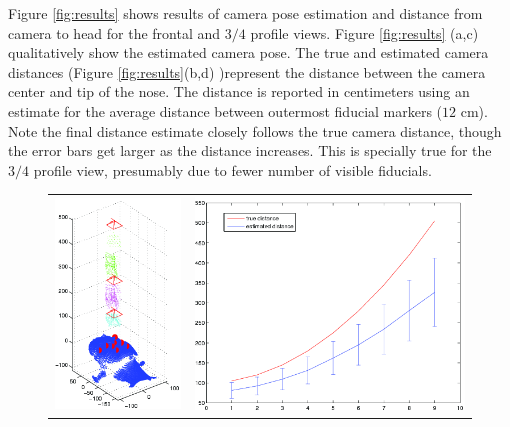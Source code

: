 \documentclass[runningheads]{llncs}
\begin{document}
Figure \ref{fig:results} shows results of camera pose estimation and distance from camera to head for the frontal and $3/4$ profile views.  Figure \ref{fig:results} (a,c) qualitatively show the estimated camera pose.  The true and estimated camera distances (Figure \ref{fig:results}(b,d) )represent the distance between the camera center and tip of the nose.  The distance is reported in centimeters using an estimate for the average distance between outermost fiducial markers ($12$ cm). Note the final distance estimate closely follows the true camera distance, though the error bars get larger as the distance increases.  This is specially true for the $3/4$ profile view, presumably due to fewer number of visible fiducials.   
\begin{figure}[ht]
\begin{tabular}{cc}
\includegraphics[width=.5\linewidth]{resources/figures/cameraloc_frontal.png} &
\includegraphics[width=.5\linewidth]{resources/figures/errorbar_frontal.png} \\

\end{tabular}
\end{figure}
\end{document}

